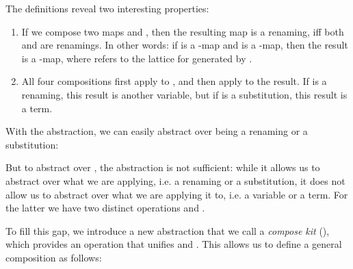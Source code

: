 \documentclass[a4paper, UKenglish, cleveref, autoref, thm-restate]{lipics-v2021}
\newenvironment{ExampleCode*}{%
  \begin{tcolorbox}[%
    colframe=white,%
    colback=yellow!5,%
    boxrule=0.0pt,%
    top=2.5pt,%
    left=2.5pt,%
    bottom=2.5pt,%
    right=2.5pt,%
    before skip=5pt,%
    after skip=5pt,%
    boxsep=0pt%
  ]\vspace{-0.2\baselineskip}%
}{%
  \vspace{-1\baselineskip}%
  \end{tcolorbox}%
}
\newcommand*\ExampleCode[1]{\begin{ExampleCode*}{#1}\end{ExampleCode*}}
\newcommand*\ACode[1]{\AgdaFontStyle{\textcolor{mygray}{#1}}}
\newcommand*\AField[1]{\AgdaField{#1}}
\newcommand*\ACon[1]{\AgdaInductiveConstructor{#1}}
\newcommand*\ADef[1]{\AgdaFunction{#1}}
\begin{document}
  \noindent
  \begin{minipage}[t]{0.65\linewidth}
  \ExampleCode\KExFourCompsI
  \end{minipage}
  \begin{minipage}[t]{0.35\linewidth}
  \ExampleCode\KExFourCompsII
  \end{minipage}

  The definitions reveal two interesting properties:
  \begin{enumerate}
  \item
    If we compose two maps \ACode{ϕ₁} and \ACode{ϕ₂}, then the
    resulting map is a renaming, iff both \ACode{ϕ₁} and \ACode{ϕ₂} are
    renamings.
    In other words:
    if \ACode{ϕ₁} is a \ACode{K₁}-map and \ACode{ϕ₂} is a \ACode{K₂}-map,
    then the result is a \ACode{(K₁ ⊔ K₂)}-map, where \ACode{⊔} refers to the
    lattice for \ACode{\{ \ADef{Kᵣ} , \ADef{Kₛ} \}}
    generated by \ACode{\ADef{Kᵣ} < \ADef{Kₛ}}.
  \item
    All four compositions first apply \ACode{ϕ₁} to \ACode{x},
    and then apply \ACode{ϕ₂} to the result.
    If \ACode{ϕ₁} is a renaming, this result is another variable, but
    if \ACode{ϕ₁} is a substitution, this result is a term.
  \end{enumerate}
  With the \ACode{\ACon{Kit}} abstraction, we can easily abstract over
  \ACode{ϕ₂} being a renaming or a substitution:

  \noindent
  \begin{minipage}[t]{0.65\linewidth}
  \ExampleCode\KExTwoCompsI
  \end{minipage}
  \begin{minipage}[t]{0.35\linewidth}
  \ExampleCode\KExTwoCompsII
  \end{minipage}

  \noindent But to abstract over \ACode{ϕ₁}, the \ACode{\ACon{Kit}} abstraction
  is not sufficient: while it allows us to abstract over what we are applying, i.e.
  a renaming or a substitution, it does not allow us to
  abstract over what we are applying it to, i.e. a variable or a term.
  For the latter we have two distinct operations \ACode{\ADef{\_\&\_}}
  and \ACode{\ADef{\_⋯\_}}.

  To fill this gap, we introduce a new abstraction that we call a
  \emph{compose kit} (\ACode{\ACon{CKit}}),
  which provides an operation \ACode{\AField{\_\&/⋯\_}} that unifies
  \ACode{\ADef{\_\&\_}} and \ACode{\ADef{\_⋯\_}}. This allows us to
  define a general composition as follows:
  \ExampleCode\KComposition
\end{document}
